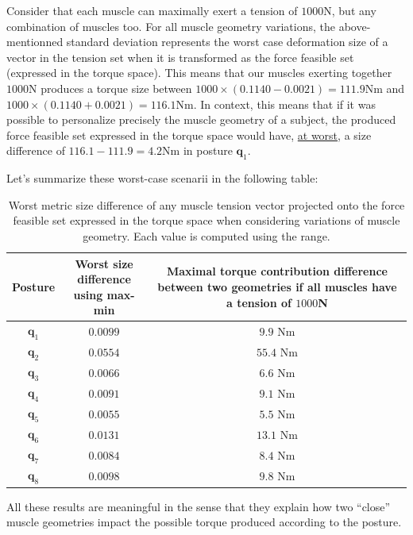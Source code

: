 Consider that each muscle can maximally exert a tension of $1000$N, but any combination of muscles too. For all muscle geometry variations, the above-mentionned standard deviation represents the worst case deformation size of a vector in the tension set when it is transformed as the force feasible set (expressed in the torque space). This means that our muscles exerting together $1000$N produces a torque size between $1000\times (0.1140 - 0.0021) = 111.9$Nm and $1000\times (0.1140 + 0.0021) = 116.1$Nm. In context, this means that if it was possible to personalize precisely the muscle geometry of a subject, the produced force feasible set expressed in the torque space would have, \underline{at worst}, a size difference of $116.1-111.9=4.2$Nm  in posture $\mathbf{q}_1$.

Let's summarize these worst-case scenarii in the following table:

\begin{table}[!ht]
    \centering
    \begin{tabular}{|c||c|c|}
    \hline
    Posture & \makecell{Worst size difference \\ using max-min} & \makecell{Maximal torque contribution difference \\ between two geometries if \\ all muscles have a tension of $1000$N} \\
    \hline
    \hline
    $\mathbf{q}_1$ & $0.0099$ & $9.9$ Nm \\ \hline
    $\mathbf{q}_2$ & $0.0554$ & $55.4$ Nm \\ \hline
    $\mathbf{q}_3$ & $0.0066$ & $6.6$ Nm \\ \hline
    $\mathbf{q}_4$ & $0.0091$ & $9.1$ Nm \\ \hline
    $\mathbf{q}_5$ & $0.0055$ & $5.5$ Nm \\ \hline
    $\mathbf{q}_6$ & $0.0131$ & $13.1$ Nm \\ \hline
    $\mathbf{q}_7$ & $0.0084$ & $8.4$ Nm \\ \hline
    $\mathbf{q}_8$ & $0.0098$ & $9.8$ Nm \\ \hline
    \end{tabular}
    \caption{Worst metric size difference of any muscle tension vector projected onto the force feasible set expressed in the torque space when considering variations of muscle geometry. Each value is computed using the range.}
    \label{tab:sensitivity2}
\end{table}

All these results are meaningful in the sense that they explain how two ``close'' muscle geometries impact the possible torque produced according to the posture.

